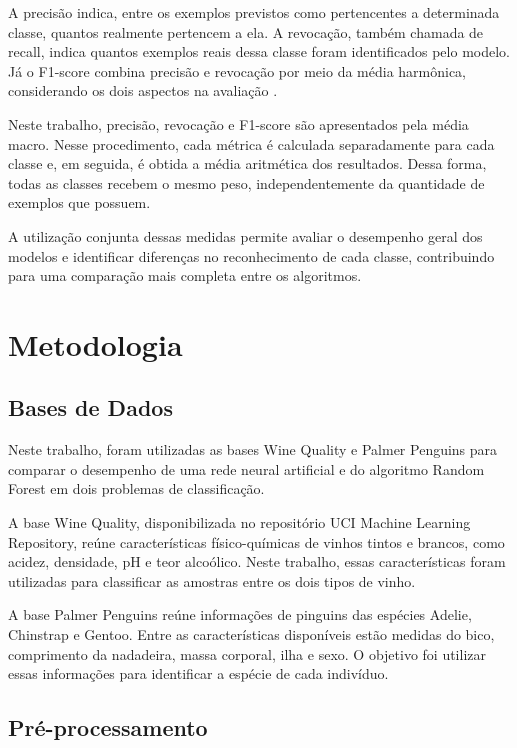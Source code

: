 \documentclass[12pt, oneside, a4paper, english, brazilian]{abntex2}
\begin{document}
A precisão indica, entre os exemplos previstos como pertencentes a determinada classe, quantos realmente pertencem a ela. A revocação, também chamada de recall, indica quantos exemplos reais dessa classe foram identificados pelo modelo. Já o F1-score combina precisão e revocação por meio da média harmônica, considerando os dois aspectos na avaliação \cite{pedregosa2011scikit}.

Neste trabalho, precisão, revocação e F1-score são apresentados pela média macro. Nesse procedimento, cada métrica é calculada separadamente para cada classe e, em seguida, é obtida a média aritmética dos resultados. Dessa forma, todas as classes recebem o mesmo peso, independentemente da quantidade de exemplos que possuem.

A utilização conjunta dessas medidas permite avaliar o desempenho geral dos modelos e identificar diferenças no reconhecimento de cada classe, contribuindo para uma comparação mais completa entre os algoritmos.

\chapter{Metodologia}

\section{Bases de Dados}

Neste trabalho, foram utilizadas as bases Wine Quality \cite{cortez2009modeling} e Palmer Penguins \cite{horst2022palmer} para comparar o desempenho de uma rede neural artificial e do algoritmo Random Forest em dois problemas de classificação.

A base Wine Quality, disponibilizada no repositório UCI Machine Learning Repository, reúne características físico-químicas de vinhos tintos e brancos, como acidez, densidade, pH e teor alcoólico. Neste trabalho, essas características foram utilizadas para classificar as amostras entre os dois tipos de vinho.

A base Palmer Penguins reúne informações de pinguins das espécies Adelie, Chinstrap e Gentoo. Entre as características disponíveis estão medidas do bico, comprimento da nadadeira, massa corporal, ilha e sexo. O objetivo foi utilizar essas informações para identificar a espécie de cada indivíduo.

\section{Pré-processamento}
\end{document}
